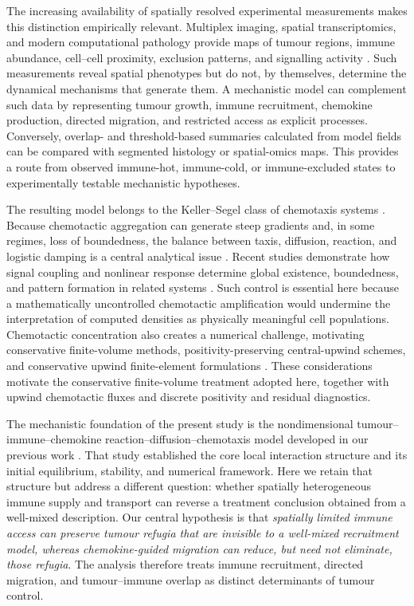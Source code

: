 \documentclass[]{interact}
\theoremstyle{plain}%
\theoremstyle{definition}
\theoremstyle{remark}
\begin{document}
The increasing availability of spatially resolved experimental measurements makes this distinction empirically relevant. Multiplex imaging, spatial transcriptomics, and modern computational pathology provide maps of tumour regions, immune abundance, cell--cell proximity, exclusion patterns, and signalling activity
\cite{rao2021exploring,yu2026full,moffitt2022emerging,palla2022spatial}. Such measurements reveal spatial phenotypes but do not, by themselves, determine the dynamical mechanisms that generate them. A mechanistic model can complement such data by representing tumour growth, immune recruitment, chemokine production, directed migration, and restricted access as explicit processes. Conversely, overlap- and threshold-based summaries calculated from model fields can be compared with segmented histology or spatial-omics maps. This provides a route from observed immune-hot, immune-cold, or immune-excluded states to experimentally testable mechanistic hypotheses.

The resulting model belongs to the Keller--Segel class of chemotaxis systems \cite{keller1970initiation,hillen2009user,wang2025analysis,horstmann20031970}.
Because chemotactic aggregation can generate steep gradients and, in some regimes, loss of boundedness, the balance between taxis, diffusion, reaction, and logistic damping is a central analytical issue \cite{winkler2010aggregation,tao2012boundedness,wang2026damage,arumugam2021keller}.
Recent studies demonstrate how signal coupling and nonlinear response determine global existence, boundedness, and pattern formation in related systems \cite{tao2024global,wang2026elliptic,li2026global,ai2015reaction,ke2022analysis,kiselev2022chemotaxis}. Such control is essential here because a mathematically uncontrolled chemotactic amplification would undermine the interpretation of computed densities as physically meaningful cell populations. Chemotactic concentration also creates a numerical challenge, motivating conservative finite-volume methods, positivity-preserving central-upwind schemes, and conservative upwind finite-element formulations \cite{filbet2006finite,chertock2008second,yu2026size,saito2007conservative}. These considerations motivate the conservative finite-volume treatment adopted here, together with upwind chemotactic fluxes and discrete positivity and residual diagnostics.

The mechanistic foundation of the present study is the nondimensional tumour--immune--chemokine reaction--diffusion--chemotaxis model developed in our previous work \cite{liu2026computational}. That study established the core local interaction structure and its initial equilibrium, stability, and numerical framework. Here we retain that structure but address a different question: whether spatially heterogeneous immune supply and transport can reverse a treatment conclusion obtained from a well-mixed description. Our central hypothesis is that \emph{spatially limited immune access can preserve tumour refugia that are invisible to a well-mixed recruitment model, whereas chemokine-guided migration can reduce, but need not eliminate, those refugia}. The analysis therefore treats immune recruitment, directed migration, and tumour--immune overlap as distinct determinants of tumour control.
\end{document}
